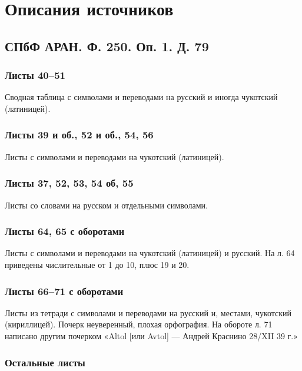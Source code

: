 \documentclass{article}
\begin{document}
\section{Описания источников} 

\subsection{СПбФ АРАН. Ф. 250. Оп. 1. Д. 79}

\subsubsection{Листы 40–51}

Сводная таблица с символами и переводами на русский и иногда чукотский (латиницей).

\subsubsection{Листы 39 и об., 52 и об., 54, 56}

Листы с символами и переводами на чукотский (латиницей).

\subsubsection{Листы 37, 52, 53, 54 об, 55}

Листы со словами на русском и отдельными символами.

\subsubsection{Листы 64, 65 с оборотами}

Листы с символами и переводами на чукотский (латиницей) и русский. На л. 64 приведены числительные от 1 до 10, плюс 19 и 20.

\subsubsection{Листы 66–71 с оборотами}

Листы из тетради с символами и переводами на русский и, местами, чукотский (кириллицей). Почерк неуверенный, плохая орфография. На обороте л. 71 написано другим почерком «Altol [или Avtol] — Андрей Краснино 28/XII 39 г.»

\subsubsection{Остальные листы}
\end{document}
